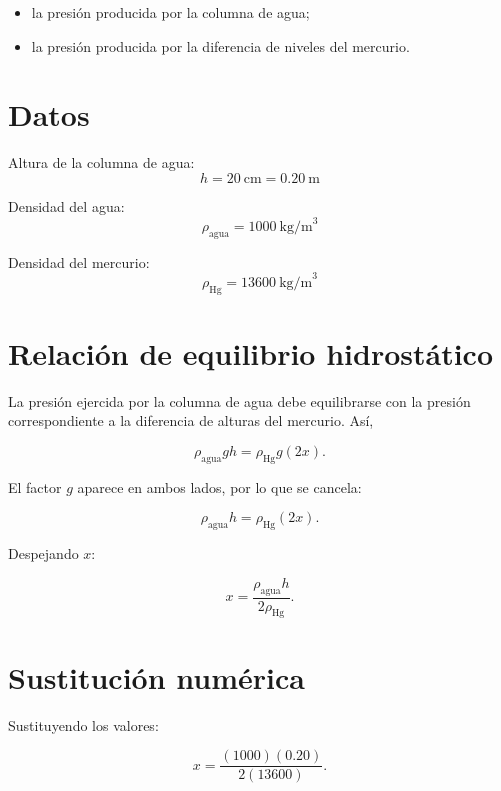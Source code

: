 \documentclass[
  letterpaper,
  DIV=11,
  numbers=noendperiod]{scrreprt}
\providecommand{\tightlist}{%
  \setlength{\itemsep}{0pt}\setlength{\parskip}{0pt}}
\begin{document}
\begin{itemize}
\tightlist
\item
  la presión producida por la columna de agua;
\item
  la presión producida por la diferencia de niveles del mercurio.
\end{itemize}

\section*{Datos}\label{datos}


Altura de la columna de agua: \[
h=20\ \text{cm}=0.20\ \text{m}
\]

Densidad del agua: \[
\rho_{\text{agua}}=1000\ \text{kg/m}^3
\]

Densidad del mercurio: \[
\rho_{\text{Hg}}=13600\ \text{kg/m}^3
\]

\section*{Relación de equilibrio
hidrostático}\label{relaciuxf3n-de-equilibrio-hidrostuxe1tico}


La presión ejercida por la columna de agua debe equilibrarse con la
presión correspondiente a la diferencia de alturas del mercurio. Así,

\[
\rho_{\text{agua}}gh=\rho_{\text{Hg}}g(2x).
\]

El factor \(g\) aparece en ambos lados, por lo que se cancela:

\[
\rho_{\text{agua}}h=\rho_{\text{Hg}}(2x).
\]

Despejando \(x\):

\[
x=\frac{\rho_{\text{agua}}h}{2\rho_{\text{Hg}}}.
\]

\section*{Sustitución numérica}\label{sustituciuxf3n-numuxe9rica}


Sustituyendo los valores:

\[
x=\frac{(1000)(0.20)}{2(13600)}.
\]
\end{document}
